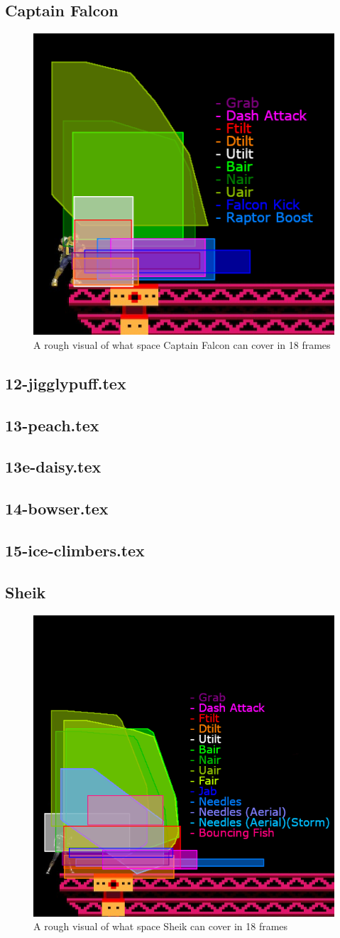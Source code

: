 \subsection{Captain Falcon}
\begin{figure}[h]
    \centering
    \includegraphics[width=.4\textwidth]{images/threat-ranges/falcon}
    \caption{A rough visual of what space Captain Falcon can cover in 18 frames\cite{ref:threat-range:falcon}}
\end{figure}

\subsection{12-jigglypuff.tex}
\subsection{13-peach.tex}
\subsection{13e-daisy.tex}
\subsection{14-bowser.tex}
\subsection{15-ice-climbers.tex}
\subsection{Sheik}
\begin{figure}[h]
    \centering
    \includegraphics[width=.4\textwidth]{images/threat-ranges/sheik}
    \caption{A rough visual of what space Sheik can cover in 18 frames\cite{ref:threat-range:sheik}}
\end{figure}

